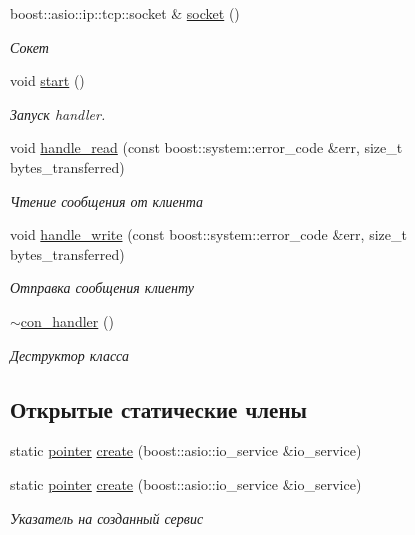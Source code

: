 \begin{DoxyCompactItemize}
boost\+::asio\+::ip\+::tcp\+::socket \& \mbox{\hyperlink{classcon__handler_ad1cbd939db0c1c543425d7cd53702a06}{socket}} ()
\begin{DoxyCompactList}\small\item\em Сокет \end{DoxyCompactList}\item 
void \mbox{\hyperlink{classcon__handler_a02d6691e226a75525a2ac83062b5c7f7}{start}} ()
\begin{DoxyCompactList}\small\item\em Запуск handler. \end{DoxyCompactList}\item 
void \mbox{\hyperlink{classcon__handler_a3b8e9edfc8fed79fcba0242a58b54bc2}{handle\+\_\+read}} (const boost\+::system\+::error\+\_\+code \&err, size\+\_\+t bytes\+\_\+transferred)
\begin{DoxyCompactList}\small\item\em Чтение сообщения от клиента \end{DoxyCompactList}\item 
void \mbox{\hyperlink{classcon__handler_a10169d7b3588adb849d7e7c02c46375a}{handle\+\_\+write}} (const boost\+::system\+::error\+\_\+code \&err, size\+\_\+t bytes\+\_\+transferred)
\begin{DoxyCompactList}\small\item\em Отправка сообщения клиенту \end{DoxyCompactList}\item 
\mbox{\hyperlink{classcon__handler_aa1bc82c764eb633355a52bd77689ed3f}{$\sim$con\+\_\+handler}} ()
\begin{DoxyCompactList}\small\item\em Деструктор класса \end{DoxyCompactList}\end{DoxyCompactItemize}
\subsection*{Открытые статические члены}
\begin{DoxyCompactItemize}
\item 
static \mbox{\hyperlink{classcon__handler_ada4a1b970f9fd8e55460a58cf7f7ce2c}{pointer}} \mbox{\hyperlink{classcon__handler_ab3cec40540ef3ff484ef0b639545eb17}{create}} (boost\+::asio\+::io\+\_\+service \&io\+\_\+service)
\item 
static \mbox{\hyperlink{classcon__handler_ada4a1b970f9fd8e55460a58cf7f7ce2c}{pointer}} \mbox{\hyperlink{classcon__handler_ab3cec40540ef3ff484ef0b639545eb17}{create}} (boost\+::asio\+::io\+\_\+service \&io\+\_\+service)
\begin{DoxyCompactList}\small\item\em Указатель на созданный сервис \end{DoxyCompactList}\end{DoxyCompactItemize}


